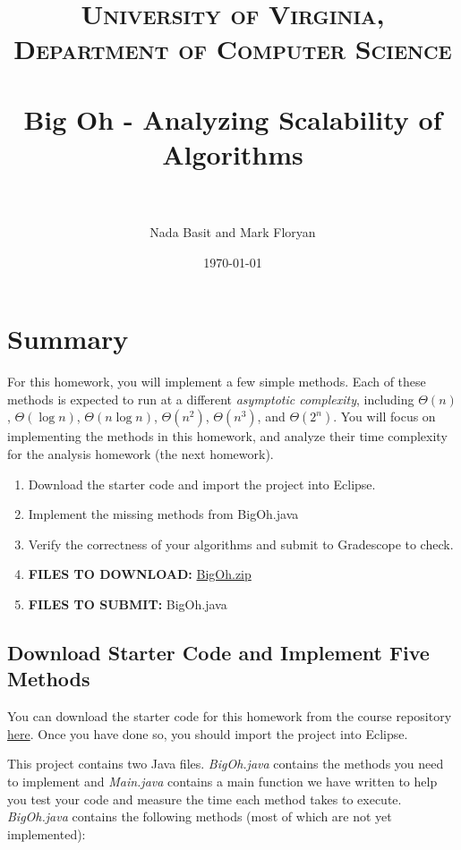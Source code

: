 \documentclass[paper=a4, fontsize=11pt, parskip=full]{scrartcl} %
\title{
\normalfont \normalsize
\textsc{University of Virginia, Department of Computer Science} \\ [25pt] %
\horrule{0.5pt} \\[0.4cm] %
\huge Big Oh - Analyzing Scalability of Algorithms \\ %
\horrule{2pt} \\[0.5cm] %
}
\author{Nada Basit and Mark Floryan}
\date{\normalsize\today} %
\numberwithin{equation}{section} %
\numberwithin{figure}{section} %
\numberwithin{table}{section} %
\begin{document}
\maketitle %


\section{Summary}

For this homework, you will implement a few simple methods. Each of these methods is expected to run at a different \emph{asymptotic complexity}, including $\Theta(n)$, $\Theta(\log n)$, $\Theta(n \log n)$, $\Theta(n^2)$, $\Theta(n^3)$, and $\Theta(2^n)$. You will focus on implementing the methods in this homework, and analyze their time complexity for the analysis homework (the next homework).

\begin{enumerate}
	\item Download the starter code and import the project into Eclipse.
	\item Implement the missing methods from BigOh.java
	\item Verify the correctness of your algorithms and submit to Gradescope to check.
	\item \textbf{FILES TO DOWNLOAD:} \href{https://uva-cs.github.io/dsa1/homeworks/BigOh/code/BigOh.zip}{BigOh.zip}
	\item \textbf{FILES TO SUBMIT:} BigOh.java
\end{enumerate}


\subsection{Download Starter Code and Implement Five Methods}

You can download the starter code for this homework from the course repository \href{https://uva-cs.github.io/dsa1/homeworks/BigOh/code/BigOh.zip}{here}. Once you have done so, you should import the project into Eclipse.

This project contains two Java files. \emph{BigOh.java} contains the methods you need to implement and \emph{Main.java} contains a main function we have written to help you test your code and measure the time each method takes to execute. \emph{BigOh.java} contains the following methods (most of which are not yet implemented):
\end{document}
